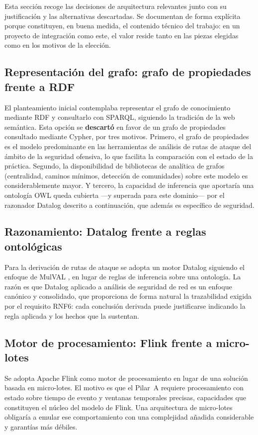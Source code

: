 Esta sección recoge las decisiones de arquitectura relevantes junto con su justificación y
las alternativas descartadas. Se documentan de forma explícita porque constituyen, en buena
medida, el contenido técnico del trabajo: en un proyecto de integración como este, el valor
reside tanto en las piezas elegidas como en los motivos de la elección.

\subsection{Representación del grafo: grafo de propiedades frente a RDF}

El planteamiento inicial contemplaba representar el grafo de conocimiento mediante RDF y
consultarlo con SPARQL, siguiendo la tradición de la web semántica. Esta opción se
\textbf{descartó} en favor de un grafo de propiedades consultado mediante Cypher, por tres
motivos. Primero, el grafo de propiedades es el modelo predominante en las herramientas de
análisis de rutas de ataque del ámbito de la seguridad ofensiva, lo que facilita la
comparación con el estado de la práctica. Segundo, la disponibilidad de bibliotecas de
analítica de grafos (centralidad, caminos mínimos, detección de comunidades) sobre este
modelo es considerablemente mayor. Y tercero, la capacidad de inferencia que aportaría una
ontología OWL queda cubierta —y superada para este dominio— por el razonador Datalog descrito
a continuación, que además es específico de seguridad.

\subsection{Razonamiento: Datalog frente a reglas ontológicas}

Para la derivación de rutas de ataque se adopta un motor Datalog siguiendo el enfoque de
MulVAL \cite{mulval}, en lugar de reglas de inferencia sobre una ontología. La razón es que
Datalog aplicado a análisis de seguridad de red es un enfoque canónico y consolidado, que
proporciona de forma natural la trazabilidad exigida por el requisito RNF6: cada conclusión
derivada puede justificarse indicando la regla aplicada y los hechos que la sustentan.

\subsection{Motor de procesamiento: Flink frente a micro-lotes}

Se adopta Apache Flink como motor de procesamiento en lugar de una solución basada en
micro-lotes. El motivo es que el Pilar~A requiere procesamiento con estado sobre tiempo de
evento y ventanas temporales precisas, capacidades que constituyen el núcleo del modelo de
Flink. Una arquitectura de micro-lotes obligaría a emular ese comportamiento con una
complejidad añadida considerable y garantías más débiles.

